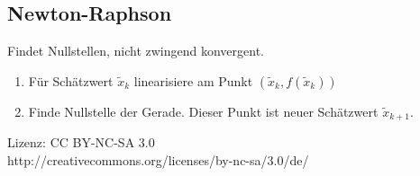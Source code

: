 \documentclass[a4paper,twocolumn,10pt]{article}
\begin{document}
\subsection*{Newton-Raphson}
Findet Nullstellen, nicht zwingend konvergent.
\begin{enumerate}
	\item Für Schätzwert $\tilde{x}_k$ linearisiere am Punkt $(\tilde{x}_k, f(\tilde{x}_k))$
	\item Finde Nullstelle der Gerade. Dieser Punkt ist neuer Schätzwert $\tilde{x}_{k+1}$.
\end{enumerate}
Lizenz: CC BY-NC-SA 3.0\\
http://creativecommons.org/licenses/by-nc-sa/3.0/de/
\end{document}
